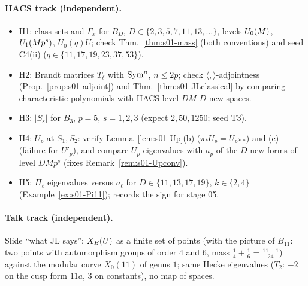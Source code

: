 \paragraph{HACS track (independent).}
\begin{itemize}
\item H1: class sets and $\Gamma_x$ for $B_D$, $D\in\{2,3,5,7,11,13,\dots\}$, levels $U_0(M)$, $U_1(Mp^s)$, $U_0(q)U$; check
  Thm.~\ref{thm:s01-mass} (both conventions) and seed C4(ii) ($q\in\{11,17,19,23,37,53\}$).
\item H2: Brandt matrices $T_\ell$ with $\mathrm{Sym}^n$, $n\le 2p$; check $\langle,\rangle$-adjointness (Prop.~\ref{prop:s01-adjoint}) and
  Thm.~\ref{thm:s01-JLclassical} by comparing characteristic polynomials with HACS level-$DM$ $D$-new spaces.
\item H3: $|S_s|$ for $B_3$, $p=5$, $s=1,2,3$ (expect $2,50,1250$; seed T3).
\item H4: $U_p$ at $S_1,S_2$: verify Lemma~\ref{lem:s01-Up}(b) ($\pi_*U_p=U_p\pi_*$) and (c) (failure for $U'_p$), and compare
  $U_p$-eigenvalues with $a_p$ of the $D$-new forms of level $DMp^s$ (fixes Remark~\ref{rem:s01-Upconv}).
\item H5: $\Pi_\ell$ eigenvalues versus $a_\ell$ for $D\in\{11,13,17,19\}$, $k\in\{2,4\}$ (Example~\ref{ex:s01-Pi11}); records the sign for
  stage 05.
\end{itemize}

\paragraph{Talk track (independent).}
Slide ``what JL says'': $X_B(U)$ as a finite set of points (with the picture of $B_{11}$: two points with automorphism groups of
order $4$ and $6$, mass $\frac14+\frac16=\frac{11-1}{24}$) against the modular curve
$X_0(11)$ of genus $1$; same Hecke eigenvalues ($T_2$: $-2$ on the cusp form $11a$, $3$ on constants), no map of spaces.

